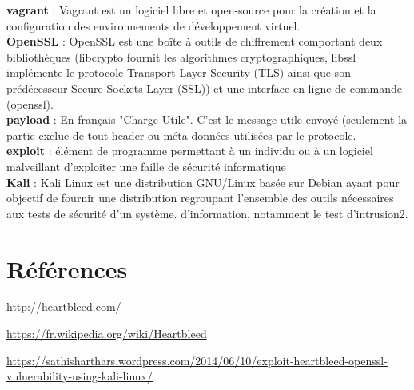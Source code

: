 \documentclass[a4paper,oneside,1pt]{article}
\begin{document}
\textbf{vagrant} : Vagrant est un logiciel libre et open-source pour la création et la configuration des environnements de développement virtuel. \\
\textbf{OpenSSL} : OpenSSL est une boîte à outils de chiffrement comportant deux bibliothèques (libcrypto fournit les algorithmes cryptographiques, libssl implémente le protocole Transport Layer Security (TLS) ainsi que son prédécesseur Secure Sockets Layer (SSL)) et une interface en ligne de commande (openssl). \\
\textbf{payload} : En français "Charge Utile". C'est le message utile envoyé (seulement la partie exclue de tout header ou méta-données utilisées par le protocole. \\
\textbf{exploit} : élément de programme permettant à un individu ou à un logiciel malveillant d'exploiter une faille de sécurité informatique \\
\textbf{Kali} : Kali Linux est une distribution GNU/Linux basée sur Debian ayant pour objectif de fournir une distribution regroupant l'ensemble des outils nécessaires aux tests de sécurité d'un système. d'information, notamment le test d'intrusion2.

\section{Références}

\href{http://heartbleed.com/}{http://heartbleed.com/}

\href{https://fr.wikipedia.org/wiki/Heartbleed}{https://fr.wikipedia.org/wiki/Heartbleed}

\href{https://sathisharthars.wordpress.com/2014/06/10/exploit-heartbleed-openssl-vulnerability-using-kali-linux/}{https://sathisharthars.wordpress.com/2014/06/10/exploit-heartbleed-openssl-vulnerability-using-kali-linux/}





\end{document}
